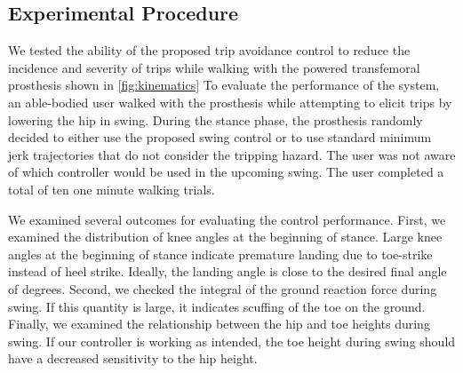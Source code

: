 \subsection{Experimental Procedure}
We tested the ability of the proposed trip avoidance control to reduce the
incidence and severity of trips while walking with the powered transfemoral
prosthesis shown in \cref{fig:kinematics} To evaluate the performance of the
system, an able-bodied user walked with the prosthesis while attempting to
elicit trips by lowering the hip in swing. During the stance phase, the
prosthesis randomly decided to either use the proposed swing control or to use
standard minimum jerk trajectories that do not consider the tripping hazard. The
user was not aware of which controller would be used in the upcoming swing.  The
user completed a total of ten one minute walking trials.

We examined several outcomes for evaluating the control performance. First, we
examined the distribution of knee angles at the beginning of stance. Large knee
angles at the beginning of stance indicate premature landing due to toe-strike
instead of heel strike. Ideally, the landing angle is close to the desired final
angle of \unit[2]{degrees}. Second, we checked the integral of the ground
reaction force during swing. If this quantity is large, it indicates scuffing of
the toe on the ground. Finally, we examined the relationship between the hip and
toe heights during swing. If our controller is working as intended, the toe
height during swing should have a decreased sensitivity to the hip height.
